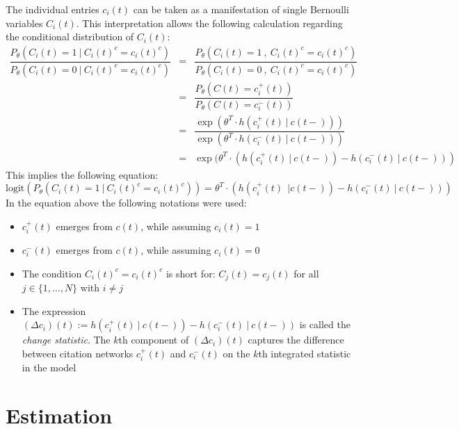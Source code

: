 \documentclass[headsepline=true, abstracton]{scrartcl}
\begin{document}
The individual entries $c_i(t)$ can be taken as a manifestation of single Bernoulli variables $C_i(t)$. This interpretation allows the following calculation regarding the conditional distribution of $C_i(t)$:
%
\begin{eqnarray*}
\dfrac{P_{\theta}(C_i(t)=1 ~|~ C_i(t)^c=c_i(t)^c)}{P_{\theta}(C_i(t)=0 ~|~ C_i(t)^c=c_i(t)^c)} &=&
\dfrac{P_{\theta}(C_i(t)=1 ~,~ C_i(t)^c=c_i(t)^c)}{P_{\theta}(C_i(t)=0 ~,~ C_i(t)^c=c_i(t)^c)} \\
                           &=&\dfrac{P_{\theta}(C(t)= c_i^+(t))}{P_{\theta}(C(t)=c_i^-(t))}\\
                           &=&\dfrac{\exp(\theta^T \cdot h(c_i^+(t)~|~c(t-)))}{\exp(\theta^T \cdot h(c_i^-(t)~|~c(t-)))}\\
                           &=& \exp(\theta^T \cdot (h(c_i^+(t)~|~c(t-)) - h(c_i^-(t)~|~c(t-)))
\end{eqnarray*}
%
This implies the following equation:
%
\begin{equation}
\text{logit}(P_{\theta}(C_i(t)=1 ~|~ C_i(t)^c=c_i(t)^c))= \theta^T \cdot (h(c_i^+(t)~~|c(t-)) - h(c_i^-(t)~|~c(t-)))
\label{Logit}
\end{equation}
In the equation above the following notations were used:
%
\begin{itemize}
\item $c_i^+(t)$ emerges from $c(t)$, while assuming $c_i(t)=1$
\item $c_i^-(t)$ emerges from $c(t)$, while assuming $c_i(t)=0$
\item The condition $C_i(t)^c=c_i(t)^c$ is short for: $C_j(t)=c_j(t)$ for all $j\in \{1,\dots,N\}$ with $i \neq j$
\item The expression $(\Delta c_i)(t):=h(c_i^+(t)~|~c(t-)) - h(c_i^-(t)~|~c(t-))$ is called the \textit{change statistic}. The $k$th component of $(\Delta c_i)(t)$ captures the difference between citation networks $c_i^+(t)$ and $c_i^-(t)$ on the $k$th integrated statistic in the model
\end{itemize}


\section{Estimation}

\end{document}
